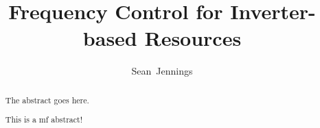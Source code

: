 \documentclass[journal]{IEEEtran}
\begin{document}
%
\title{Frequency Control for Inverter-based Resources}
%
%
%

\author{Sean~Jennings}%



% 



\maketitle

\begin{abstract}
The abstract goes here.

This is a mf abstract!
\end{abstract}







%
\IEEEpeerreviewmaketitle
\end{document}
